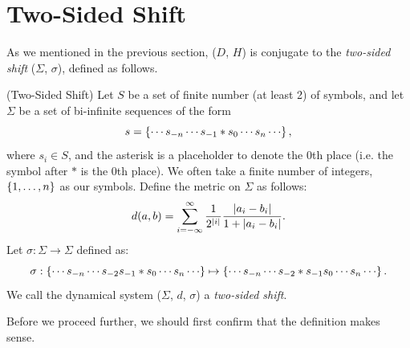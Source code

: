 \documentclass[12pt,twoside]{book}
\begin{document}
\section{Two-Sided Shift}
As we mentioned in the previous section, ($D$, $H$) is conjugate to the \textit{two-sided shift} ($\Sigma$, $\sigma$), defined as follows.
\begin{definition}
  (Two-Sided Shift)
  Let $S$ be a set of finite number (at least 2) of symbols, and let $\Sigma$ be a set of bi-infinite sequences of the form
  \begin{equation*}
    s = \set{ \cdots s_{-n} \cdots s_{-1} * s_0 \cdots s_n \cdots },
  \end{equation*}
  where $s_i \in S$, and the asterisk is a placeholder to denote the 0th place (i.e. the symbol after $*$ is the 0th place).
  We often take a finite number of integers, $\left \{ 1, \ldots, n \right \}$ as our symbols.
  Define the metric on $\Sigma$ as follows:
  \begin{equation*}
    d(a,b) = \sum\limits_{i = -\infty}^{\infty} \frac{1}{2^{\left | i \right |}} \frac{\left | a_i - b_i \right |}{1 + \left | a_i - b_i \right |}.
  \end{equation*}
  Let $\sigma: \Sigma \to \Sigma$ defined as:
  \begin{equation*}
    \sigma: \set{ \cdots s_{-n} \cdots s_{-2} s_{-1} * s_0 \cdots s_n \cdots } \mapsto \set{ \cdots s_{-n} \cdots s_{-2} * s_{-1} s_0 \cdots s_n \cdots }.
  \end{equation*}
  We call the dynamical system ($\Sigma$, $d$, $\sigma$) a \textit{two-sided shift}.
\end{definition}
Before we proceed further, we should first confirm that the definition makes sense.
\end{document}
